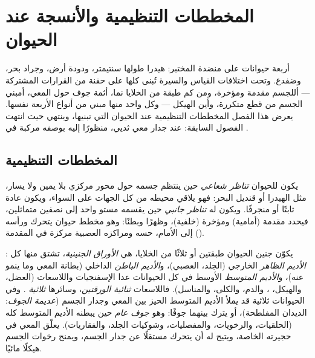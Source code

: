 \chapter{المخططات التنظيمية والأنسجة عند الحيوان}\label{ch:b1:body-plans-tissues}

أربعة حيوانات على منضدة المختبر: هيدرا طولها سنتيمتر، ودودة أرض،
وجراد بحر، وضفدع. وتحت اختلافات القياس والسيرة تُبنى كلها على حفنة
من القرارات المشتركة --- أللجسم مقدمة ومؤخرة، ومن كم طبقة من الخلايا
نما، أثمة جوف حول المعي، أمبني الجسم من قطع متكررة، وأين الهيكل ---
وكل واحد منها مبني من أنواع  الأربعة نفسها. يعرض هذا الفصل
المخططات التنظيمية عند الحيوان  التي تبنيها، وينتهي حيث
انتهت الفصول السابقة: عند جدار معي ثديي، منظورًا إليه بوصفه 
مركبة في .

\section{المخططات التنظيمية}

\begin{definition}\label{def:b1:body-plans-tissues:symmetry}
يكون للحيوان \emph{تناظر شعاعي} حين ينتظم جسمه
حول محور مركزي بلا يمين ولا يسار، مثل الهيدرا أو قنديل البحر: فهو
يلاقي محيطه من كل الجهات على السواء، ويكون عادة ثابتًا أو منجرفًا.
ويكون له \emph{تناظر جانبي} حين يقسمه مستو واحد
إلى نصفين متماثلين، فيحدد مقدمة (أمامية) ومؤخرة (خلفية)، وظهرًا
وبطنًا: وهو مخطط حيوان يتحرك ورأسه إلى الأمام،  حسه ومراكزه
العصبية مركزة في المقدمة ().
\end{definition}

\begin{definition}\label{def:b1:body-plans-tissues:layers}
يكوّن جنين الحيوان طبقتين أو ثلاثًا من الخلايا، هي \emph{الأوراق
الجنينية}، تشتق منها كل : \emph{الأديم
الظاهر} الخارجي (الجلد،  العصبي)،
و\emph{الأديم الباطن} الداخلي (بطانة المعي وما
ينمو عنه)، و\emph{الأديم المتوسط} الأوسط في كل
الحيوانات عدا الإسفنجيات واللاسعات (العضل، والهيكل، ،
والدم، والكلى، والمناسل). فاللاسعات \emph{ثنائية الورقتين}، وسائرها
\emph{ثلاثية }. وفي الحيوانات ثلاثية  قد يملأ الأديم
المتوسط الحيز بين المعي وجدار الجسم (\emph{عديمة الجوف}: الديدان
المفلطحة)، أو يترك بينهما جوفًا: وهو \emph{جوف عام}
حين يبطنه الأديم المتوسط كله (الحلقيات، والرخويات، والمفصليات،
وشوكيات الجلد، والفقاريات).  يعلّق المعي في حجيرته
الخاصة، ويتيح له أن يتحرك مستقلًا عن جدار الجسم، ويمنح رخوات الجسم
هيكلًا مائيًا.
\end{definition}

